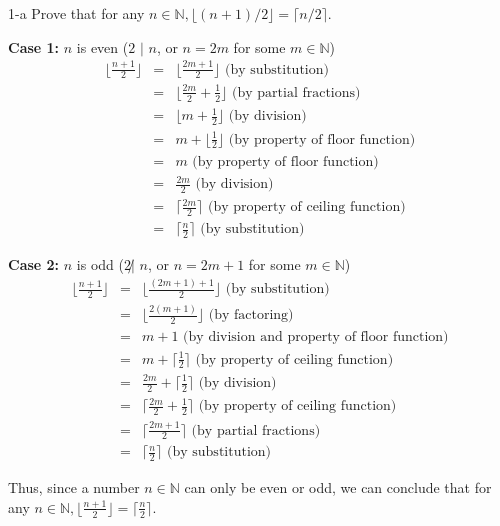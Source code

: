 \documentclass[11pt]{article}
\begin{document}
\begin{prob}{1-a}
Prove that for any $n \in \mathbb{N}, \lfloor(n+1)/2\rfloor = \lceil n/2 \rceil$.
\end{prob}
\begin{sol}

\textbf{Case 1:} $n$ is even ($2$ $|$ $n$, or $n = 2m$ for some $m \in \mathbb{N}$) 
\begin{eqnarray*}
\Big\lfloor\frac{n+1}{2}\Big\rfloor & = & \Big\lfloor\frac{2m + 1}{2}\Big\rfloor \text{ (by substitution)}\\
& = & \Big\lfloor\frac{2m}{2}  + \frac{1}{2}\Big\rfloor \text{ (by partial fractions)}\\
& = & \Big\lfloor m  + \frac{1}{2}\Big\rfloor \text{ (by division)}\\
& = & m + \Big\lfloor\frac{1}{2}\Big\rfloor \text{ (by property of floor function)}\\
& = & m \text{ (by property of floor function)}\\
& = & \frac{2m}{2} \text{ (by division)} \\
& = & \Big\lceil\frac{2m}{2}\Big\rceil \text{ (by property of ceiling function)}\\
& = & \Big\lceil\frac{n}{2}\Big\rceil \text{ (by substitution)}
\end{eqnarray*}

\textbf{Case 2:} $n$ is odd ($2 \not|$  $n$, or $n = 2m + 1$ for some $m \in \mathbb{N}$) 
\begin{eqnarray*}
\Big\lfloor\frac{n+1}{2}\Big\rfloor & = & \Big\lfloor\frac{(2m + 1) +1}{2}\Big\rfloor \text{ (by substitution)}\\
& = & \Big\lfloor\frac{2(m + 1)}{2}\Big\rfloor \text{ (by factoring)}\\
& = & m + 1 \text{ (by division and property of floor function)}\\
& = & m + \Big\lceil\frac{1}{2}\Big\rceil \text{ (by property of ceiling function)}\\
& = & \frac{2m}{2} + \Big\lceil\frac{1}{2}\Big\rceil \text{ (by division)}\\
& = & \Big\lceil\frac{2m}{2} + \frac{1}{2}\Big\rceil \text{ (by property of ceiling function)}\\
& = & \Big\lceil\frac{2m + 1}{2}\Big\rceil  \text{ (by partial fractions)}\\
& = & \Big\lceil\frac{n}{2}\Big\rceil \text{ (by substitution)}
\end{eqnarray*}

Thus, since a number $n \in \mathbb{N}$ can only be even or odd, we can conclude that for any $n \in \mathbb{N}, \Big\lfloor\frac{n+1}{2}\Big\rfloor = \Big\lceil\frac{n}{2}\Big\rceil$.
\end{sol}
\end{document}
